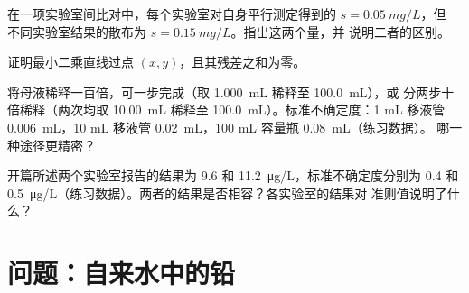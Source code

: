 \begin{exercise}[$\star\star$]\label{exo:b2:measurement-statistics:9}
在一项实验室间比对中，每个实验室对自身平行测定得到的 $s = \qty{0.05}{mg/L}$，但
不同实验室结果的散布为 $s = \qty{0.15}{mg/L}$。指出这两个量，并
说明二者的区别。
\end{exercise}

\begin{exercise}[$\star\star\star$]\label{exo:b2:measurement-statistics:10}
证明最小二乘直线过点 $(\bar x, \bar y)$，且其残差之和为零。
\end{exercise}

\begin{exercise}[$\star\star\star$]\label{exo:b2:measurement-statistics:11}
将母液稀释一百倍，可一步完成（取 \qty{1.000}{mL} 稀释至 \qty{100.0}{mL}），或
分两步十倍稀释（两次均取 \qty{10.00}{mL} 稀释至 \qty{100.0}{mL}）。标准不确定度：1 mL
移液管 \qty{0.006}{mL}，10 mL 移液管 \qty{0.02}{mL}，100 mL 容量瓶 \qty{0.08}{mL}（练习数据）。
哪一种途径更精密？
\end{exercise}

\begin{exercise}[$\star\star\star$]\label{exo:b2:measurement-statistics:12}
开篇所述两个实验室报告的结果为 9.6 和 \qty{11.2}{\micro g/L}，标准不确定度分别为
0.4 和 \qty{0.5}{\micro g/L}（练习数据）。两者的结果是否相容？各实验室的结果对
准则值说明了什么？
\end{exercise}

\section{问题：自来水中的铅}

